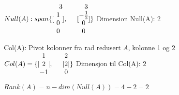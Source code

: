 \documentclass{article}
\begin{document}
$Null(A): span\{
[
\begin{matrix}
    -3\\
    1\\
    0\\
    0
\end{matrix}
], \hspace{5 mm}
[
\begin{matrix}
    -3\\
    -\frac{1}{2}\\
    0\\
    0
\end{matrix}
]
\}
$
Dimension Null(A): 2

Col(A): Pivot kolonner fra rad redusert $A$, kolonne 1 og 2\\
$Col(A) = \{ |
\begin{matrix}
    1\\
    2\\
    -1
\end{matrix}
|, \hspace{5 mm}
|
\begin{matrix}
    2\\
    2\\
    0
\end{matrix}
| \}
$
Dimensjon til Col(A): 2

$Rank(A) = n-dim(Null(A)) = 4-2 = 2$
\end{document}
